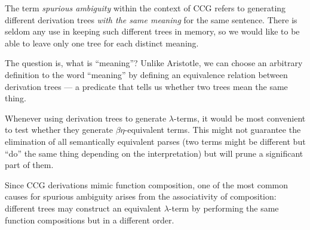 \documentclass[main.tex]{subfiles}
\begin{document}
The term \emph{spurious ambiguity} within the context of CCG refers to generating
different derivation trees \emph{with the same meaning} for the same sentence. There
is seldom any use in keeping such different trees in memory, so we would like
to be able to leave only one tree for each distinct meaning.

The question is, what is ``meaning''? Unlike Aristotle, we can choose an arbitrary
definition to the word ``meaning'' by defining an equivalence relation between
derivation trees --- a predicate that tells us whether two trees mean the same
thing.

Whenever using derivation trees to generate $\lambda$-terms, it would be most
convenient to test whether they generate $\beta\eta$-equivalent terms. This might
not guarantee the elimination of all semantically equivalent parses (two terms
might be different but ``do'' the same thing depending on the interpretation)
but will prune a significant part of them.

Since CCG derivations mimic function composition, one of the most common causes
for spurious ambiguity arises from the associativity of composition: different
trees may construct an equivalent $\lambda$-term by performing the same function
compositions but in a different order.
\end{document}
